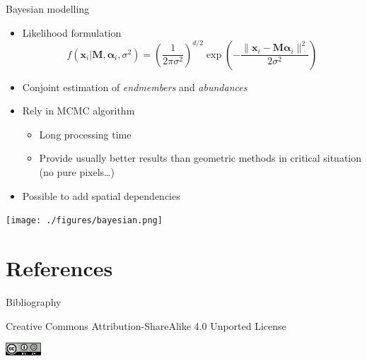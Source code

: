 \documentclass[10pt,aspectratio=1610]{beamer}
\begin{document}
\begin{frame}[label={sec:org24aee30}]{Bayesian modelling}
\begin{itemize}
\item Likelihood formulation
$$f(\mathbf{x}_i|\mathbf{M},\boldsymbol{\alpha}_i,\sigma^2) = \left(\frac{1}{2\pi\sigma^2}\right)^{d/2}\exp\left(-\frac{\|\mathbf{x}_i-\mathbf{M}\boldsymbol{\alpha}_i\|^2}{2\sigma^2}\right)$$
\item Conjoint estimation of \emph{endmembers} and \emph{abundances} \cite{Dobigeon_IEEE_Trans_SP_2009}
\item Rely in MCMC algorithm
\begin{itemize}
\item Long processing time
\item Provide usually better results than geometric methods in critical situation (no pure pixels\ldots{})
\end{itemize}
\item Possible to add spatial dependencies \cite{Eches_IEEE_Trans_GRS_2011}
\end{itemize}

\begin{center}
\texttt{[image: ./figures/bayesian.png]}
\end{center}
\end{frame}
\section{References}
\label{sec:org864821a}
\begin{frame}[fragile,allowframebreaks,label=]{Bibliography}
\printbibliography
\end{frame}
\begin{frame}[label={sec:orgeea4966}]{}
\begin{center}
\tiny Creative Commons Attribution-ShareAlike 4.0 Unported License
\normalsize

\begin{center}
\includegraphics[width=0.1\textwidth]{figures/cc-by-sa.png}
\end{center}
\end{center}
\end{frame}
\end{document}
